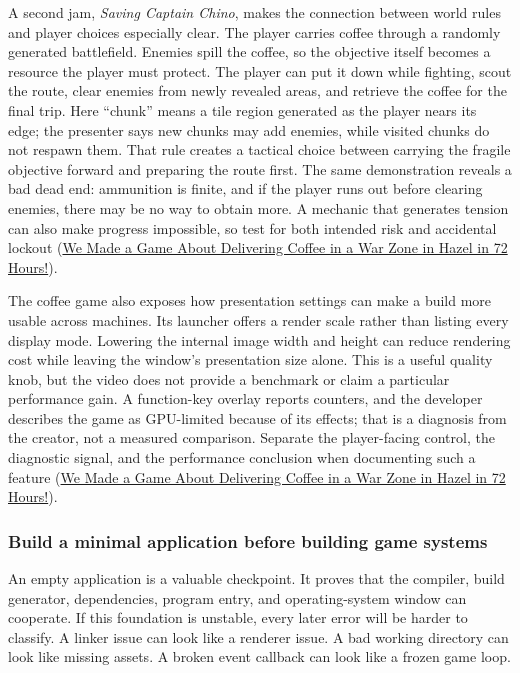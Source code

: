 A second jam, \emph{Saving Captain Chino}, makes the connection between world rules and player choices especially clear. The player carries coffee through a randomly generated battlefield. Enemies spill the coffee, so the objective itself becomes a resource the player must protect. The player can put it down while fighting, scout the route, clear enemies from newly revealed areas, and retrieve the coffee for the final trip. Here ``chunk'' means a tile region generated as the player nears its edge; the presenter says new chunks may add enemies, while visited chunks do not respawn them. That rule creates a tactical choice between carrying the fragile objective forward and preparing the route first. The same demonstration reveals a bad dead end: ammunition is finite, and if the player runs out before clearing enemies, there may be no way to obtain more. A mechanic that generates tension can also make progress impossible, so test for both intended risk and accidental lockout (\href{https://www.youtube.com/watch?v=ahrdtYwBLTk&t=6m42s}{We Made a Game About Delivering Coffee in a War Zone in Hazel in 72 Hours!}).

The coffee game also exposes how presentation settings can make a build more usable across machines. Its launcher offers a render scale rather than listing every display mode. Lowering the internal image width and height can reduce rendering cost while leaving the window's presentation size alone. This is a useful quality knob, but the video does not provide a benchmark or claim a particular performance gain. A function-key overlay reports counters, and the developer describes the game as GPU-limited because of its effects; that is a diagnosis from the creator, not a measured comparison. Separate the player-facing control, the diagnostic signal, and the performance conclusion when documenting such a feature (\href{https://www.youtube.com/watch?v=ahrdtYwBLTk&t=1m7s}{We Made a Game About Delivering Coffee in a War Zone in Hazel in 72 Hours!}).

\subsubsection{Build a minimal application before building game systems}\label{build-a-minimal-application-before-building-game-systems}

An empty application is a valuable checkpoint. It proves that the compiler, build generator, dependencies, program entry, and operating-system window can cooperate. If this foundation is unstable, every later error will be harder to classify. A linker issue can look like a renderer issue. A bad working directory can look like missing assets. A broken event callback can look like a frozen game loop.


